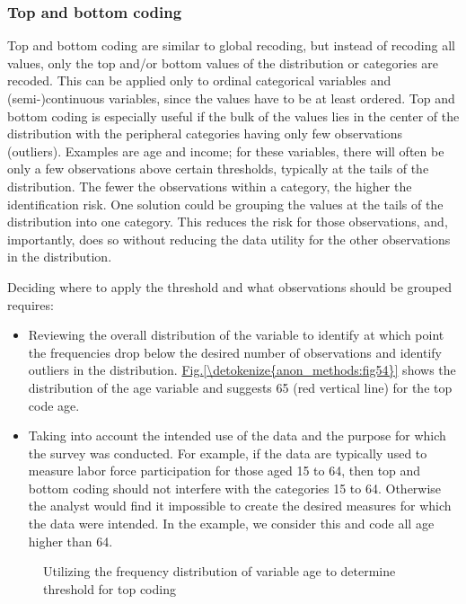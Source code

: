 \documentclass[letterpaper,10pt,english]{sphinxmanual}
\begin{document}
\subsubsection{Top and bottom coding}
\label{\detokenize{anon_methods:top-and-bottom-coding}}
Top and bottom coding are similar to global recoding, but instead of
recoding all values, only the top and/or bottom values of the
distribution or categories are recoded. This can be applied only to
ordinal categorical variables and (semi-)continuous variables, since the
values have to be at least ordered. Top and bottom coding is especially
useful if the bulk of the values lies in the center of the distribution
with the peripheral categories having only few observations (outliers).
Examples are age and income; for these variables, there will often be
only a few observations above certain thresholds, typically at the tails
of the distribution. The fewer the observations within a category, the
higher the identification risk. One solution could be grouping the
values at the tails of the distribution into one category. This reduces
the risk for those observations, and, importantly, does so without
reducing the data utility for the other observations in the
distribution.

Deciding where to apply the threshold and what observations should be
grouped requires:
\begin{itemize}
\item {} 
Reviewing the overall distribution of the variable to identify at
which point the frequencies drop below the desired number of
observations and identify outliers in the distribution. \hyperref[\detokenize{anon_methods:fig54}]{Fig.\@ \ref{\detokenize{anon_methods:fig54}}}
shows the distribution of the age variable and suggests 65 (red
vertical line) for the top code age.

\item {} 
Taking into account the intended use of the data and the purpose for
which the survey was conducted. For example, if the data are
typically used to measure labor force participation for those aged 15
to 64, then top and bottom coding should not interfere with the
categories 15 to 64. Otherwise the analyst would find it impossible
to create the desired measures for which the data were intended. In
the example, we consider this and code all age higher than 64.

\end{itemize}

\begin{figure}[htbp]
\centering
\capstart

\noindent{}
\caption{Utilizing the frequency distribution of variable age to determine threshold for top coding}\label{\detokenize{anon_methods:fig54}}\label{\detokenize{anon_methods:id31}}\end{figure}
\end{document}
